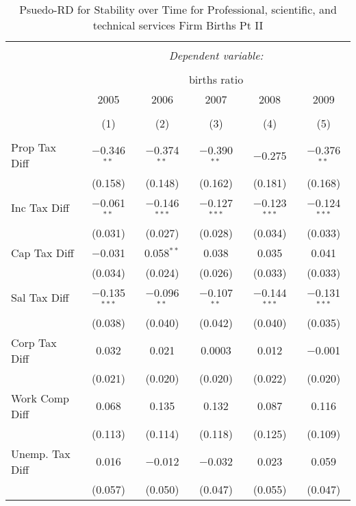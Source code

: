 
\begin{table}[!htbp] \centering 
  \caption{Psuedo-RD for Stability over Time for  Professional, scientific, and technical services Firm Births Pt II} 
  \label{54year} 
\small 
\begin{tabular}{@{\extracolsep{5pt}}lccccc} 
\\[-1.8ex]\hline 
\hline \\[-1.8ex] 
 & \multicolumn{5}{c}{\textit{Dependent variable:}} \\ 
\cline{2-6} 
\\[-1.8ex] & \multicolumn{5}{c}{births ratio} \\ 
 & 2005 & 2006 & 2007 & 2008 & 2009 \\ 
\\[-1.8ex] & (1) & (2) & (3) & (4) & (5)\\ 
\hline \\[-1.8ex] 
 Prop Tax Diff & $-$0.346$^{**}$ & $-$0.374$^{**}$ & $-$0.390$^{**}$ & $-$0.275 & $-$0.376$^{**}$ \\ 
  & (0.158) & (0.148) & (0.162) & (0.181) & (0.168) \\ 
  Inc Tax Diff & $-$0.061$^{**}$ & $-$0.146$^{***}$ & $-$0.127$^{***}$ & $-$0.123$^{***}$ & $-$0.124$^{***}$ \\ 
  & (0.031) & (0.027) & (0.028) & (0.034) & (0.033) \\ 
  Cap Tax Diff & $-$0.031 & 0.058$^{**}$ & 0.038 & 0.035 & 0.041 \\ 
  & (0.034) & (0.024) & (0.026) & (0.033) & (0.033) \\ 
  Sal Tax Diff & $-$0.135$^{***}$ & $-$0.096$^{**}$ & $-$0.107$^{**}$ & $-$0.144$^{***}$ & $-$0.131$^{***}$ \\ 
  & (0.038) & (0.040) & (0.042) & (0.040) & (0.035) \\ 
  Corp Tax Diff & 0.032 & 0.021 & 0.0003 & 0.012 & $-$0.001 \\ 
  & (0.021) & (0.020) & (0.020) & (0.022) & (0.020) \\ 
  Work Comp Diff & 0.068 & 0.135 & 0.132 & 0.087 & 0.116 \\ 
  & (0.113) & (0.114) & (0.118) & (0.125) & (0.109) \\ 
  Unemp. Tax Diff & 0.016 & $-$0.012 & $-$0.032 & 0.023 & 0.059 \\ 
  & (0.057) & (0.050) & (0.047) & (0.055) & (0.047) \\ 

\end{tabular}
\end{table}

